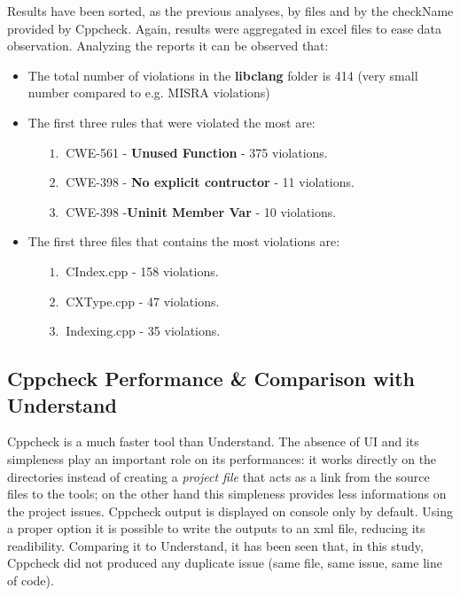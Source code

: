 Results have been sorted, as the previous analyses, by files and by the checkName provided by Cppcheck. Again, results were aggregated in excel files to ease data observation.\newline
Analyzing the reports it can be observed that:
\begin{itemize}
	\item The total number of violations in the \textbf{libclang} folder is 414 (very small number compared to e.g. MISRA violations)
	\item The first three rules that were violated the most are:
	\begin{itemize}
		\item[$1.\:$] CWE-561 - \textbf{Unused Function} - 375 violations.
		\item[$2.\:$] CWE-398 - \textbf{No explicit contructor} - 11 violations.
		\item[$3.\:$] CWE-398 -\textbf{Uninit Member Var} - 10 violations.
	\end{itemize}
	\item The first three files that contains the most violations are:
		\begin{itemize}
		\item[$1.\:$] CIndex.cpp - 158 violations.
		\item[$2.\:$] CXType.cpp - 47 violations.
		\item[$3.\:$] Indexing.cpp - 35 violations.
	\end{itemize}
\end{itemize}

\subsection{Cppcheck Performance \& Comparison with Understand}

Cppcheck is a much faster tool than Understand. The absence of UI and its simpleness play an important role on its performances: it works directly on the directories instead of creating a \textsl{project file} that acts as a link from the source files to the tools; on the other hand this simpleness provides less informations on the project issues.\newline
Cppcheck output is displayed on console only by default. Using a proper option it is possible to write the outputs to an xml file, reducing its readibility.\newline
Comparing it to Understand, it has been seen that, in this study, Cppcheck did not produced any duplicate issue (same file, same issue, same line of code).\newline\newline

